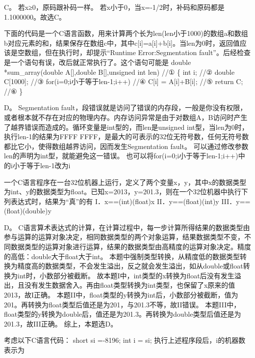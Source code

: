 \begin{solution}C。 若x≥0，原码跟补码一样。
若x小于0，当x=-1/2时，补码和原码都是1.1000000。故选C。
\end{solution}
\question 下面的代码是一个C语言函数，用来计算两个长为len(len小于1000)的数组a和数组b对应元素的和，结果保存在数组c中，其中c{[}i{]}=a{[}i{]}+b{[}i{]}。当len为0时，返回值应该是空数组，但在执行时，却提示``Runtime
Error:Segmentation
fault''。后经检查是一个语句有误，改后就正常执行了。这个语句可能是 double
*sum\_array(double A{[}{]},double B{[}{]},unsigned int len) //① \{ int
i; //② double C{[}1000{]}; //③ for(i=0;i小于等于len-1;i++) //④ C{[}i{]}
= A{[}i{]}+B{[}i{]}; //⑤ return C; //⑥ \}
\par{}
\begin{solution}D。 Segmentation
fault，段错误就是访问了错误的内存段，一般是你没有权限，或者根本就不存在对应的物理内存。内存访问异常是由于对数组A，B访问时产生了越界错误而造成的。循环变量是int型的，而len是unsigned
int型，当len为0时，执行len-1的结果为FFFF
FFFF，是最大的可表示的32位无符号数，任何无符号数都比它小，使得数组越界访问，因而发生Segmentation
fault。 可以通过修改参数len的声明为int型，就能避免这一错误。
也可以将for(i=0;i小于等于len-1;i++)中的i小于等于len-1改为i
\end{solution}
\question 一个C语言程序在一台32位机器上运行，定义了两个变量x，y，其中x的数据类型为int、y的数据类型为float。已知x=2013，y=201.3，则在一个32位机器中执行下列表达式时，结果为``真''的有
I．x==(int)(float)x II．y==(float)(int)y III．y==(float)(double)y
\par{}
\begin{solution}D。
C语言算术表达式的计算，在计算过程中，每一步计算所得结果的数据类型由参与运算的运算对象决定，相同数据类型的两个对象运算，结果数据类型不变，不同数据类型的运算对象进行运算，结果的数据类型由高精度的运算对象决定。精度的高低：double大于float大于int。
本题中强制类型转换，从精度低的数据类型转换为精度高的数据类型，不会发生溢出，反之就会发生溢出，如从double或float转换为int时，小数部分被截断。
故本题I中，int类型的x转换为float后没有发生溢出，且没有发生数据舍入。再由float类型转换为int类型，也保留了x原来的值2013，故I正确。
本题II中，float类型的y转换为int后，小数部分被截断，值为201。再转换为float类型后值还是为201，与201.3不等，故II错误。
本题III中，float类型的y转换为double后，值还是为201.3。再转换为double类型后值还是为201.3，故III正确。
综上，本题选D。
\end{solution}
\question 考虑以下C语言代码： short si =-8196; int i = si;
执行上述程序段后，i的机器数表示为
